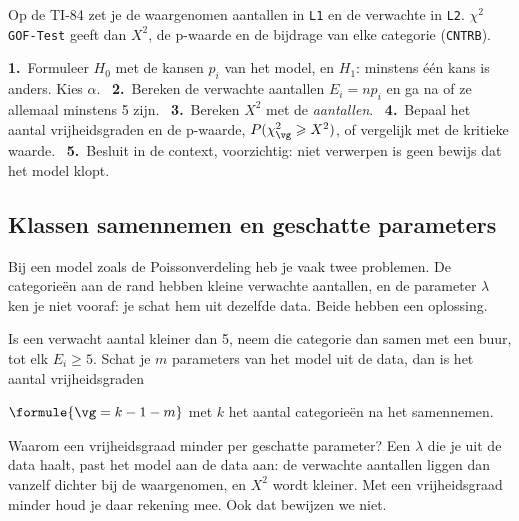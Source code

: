 Op de TI-84 zet je de waargenomen aantallen in \texttt{L1} en de verwachte in \texttt{L2}. \texttt{$\chi^2$GOF-Test} geeft dan $X^2$, de p-waarde en de bijdrage van elke categorie (\texttt{CNTRB}).

\begin{werkwijze}
\textbf{1.}~Formuleer $H_0$ met de kansen $p_i$ van het model, en $H_1$: minstens één kans is anders. Kies $\alpha$. \ \textbf{2.}~Bereken de verwachte aantallen $E_i = n p_i$ en ga na of ze allemaal minstens 5 zijn. \ \textbf{3.}~Bereken $X^2$ met de \textit{aantallen}. \ \textbf{4.}~Bepaal het aantal vrijheidsgraden en de p-waarde, $P(\chi^2_{\vg} \geqslant X^2)$, of vergelijk met de kritieke waarde. \ \textbf{5.}~Besluit in de context, voorzichtig: niet verwerpen is geen bewijs dat het model klopt.
\end{werkwijze}

\begin{oefeningen}

\end{oefeningen}

\subsection{Klassen samennemen en geschatte parameters}

Bij een model zoals de Poissonverdeling heb je vaak twee problemen. De categorieën aan de rand hebben kleine verwachte aantallen, en de parameter $\lambda$ ken je niet vooraf: je schat hem uit dezelfde data. Beide hebben een oplossing.

\begin{theorie}
Is een verwacht aantal kleiner dan 5, neem die categorie dan samen met een buur, tot elk ${E_i \geqslant 5}$. Schat je $m$ parameters van het model uit de data, dan is het aantal vrijheidsgraden

\vspace{1mm}
\qquad $\formule{\vg = k - 1 - m}$ \qquad met $k$ het aantal categorieën na het samennemen.
\end{theorie}

Waarom een vrijheidsgraad minder per geschatte parameter? Een $\lambda$ die je uit de data haalt, past het model aan de data aan: de verwachte aantallen liggen dan vanzelf dichter bij de waargenomen, en $X^2$ wordt kleiner. Met een vrijheidsgraad minder houd je daar rekening mee. Ook dat bewijzen we niet.

